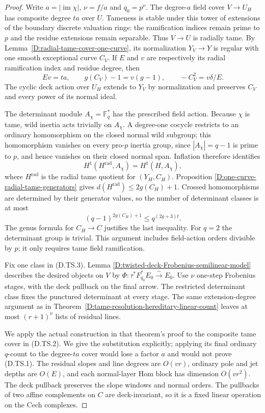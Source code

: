 \begin{proof}
Write $a=|\operatorname{im}\chi|$, $\nu=f/a$ and
$q_0=p^\nu$. The degree-$a$ field cover $V\to U_H$
has composite degree $ta$ over $U$. Tameness is stable
under this tower of extensions of the boundary discrete
valuation rings: the ramification indices remain prime
to $p$ and the residue extensions remain separable.
Thus $V\to U$ is radially tame. By
Lemma~\ref{D:radial-tame-cover-one-curve}, its normalization
$Y_V\to Y$ is regular with one smooth exceptional curve
$C_V$. If $E$ and $v$ are respectively its radial
ramification index and residue degree, then
\[
 Ev=ta,\qquad g(C_V)-1=v(g-1),\qquad
                    -C_V^2=v\delta/E.                 \tag{D.TS.2}
\]
The cyclic deck action over $U_H$ extends to $Y_V$ by
normalization and preserves $C_V$ and every power of
its normal ideal.

The determinant module $A_\chi=\mathbb F_q^*$ has
the prescribed field action. Because $\chi$ is tame,
wild inertia acts trivially on $A_\chi$. A degree-one
cocycle restricts to an ordinary homomorphism on the
closed normal wild subgroup; this homomorphism vanishes
on every pro-$p$ inertia group, since $|A_\chi|=q-1$
is prime to $p$, and hence vanishes on their closed
normal span. Inflation therefore identifies
\[
 H^1(H^{\mathrm{rad}},A_\chi)=H^1(H,A_\chi),
\]
where $H^{\mathrm{rad}}$ is the radial tame quotient for
$(Y_H,C_H)$. Proposition
\ref{D:one-curve-radial-tame-generators} gives
$d(H^{\mathrm{rad}})\leq2g(C_H)+1$. Crossed
homomorphisms are determined by their generator values,
so the number of determinant classes is at most
\[
          (q-1)^{2g(C_H)+1}\leq q^{(2g+3)t}.            \tag{D.TS.3}
\]
The genus formula for $C_H\to C$ justifies the last
inequality. For $q=2$ the determinant group is trivial.
This argument includes field-action orders divisible
by $p$; it only requires tame field ramification.

Fix one class in (D.TS.3). Lemma
\ref{D:twisted-deck-Frobenius-semilinear-model} describes
the desired objects on $V$ by
$\Phi:\tau^*F_{q_0}^*E_0\xrightarrow{\sim}E_0$.
Use $\nu$ one-step Frobenius stages, with the deck
pullback on the final arrow. The restricted determinant
class fixes the punctured determinant at every stage.
The same extension-degree argument as in
Theorem~\ref{D:tame-resolution-hereditary-linear-count}
leaves at most $(r+1)^\nu$ lists of residual lines.

We apply the actual construction in that theorem's
proof to the composite tame cover in (D.TS.2). We give
the substitution explicitly; applying its final ordinary
$q$-count to the degree-$ta$ cover would lose a factor
$a$ and would not prove (D.TS.1). The residual slopes
and line degrees are $O(vr)$, ordinary pole and jet
depths are $O(E)$, and each normal-layer Hom block has
dimension $O(vr^2)$. The deck pullback preserves the
slope windows and normal orders. The pullbacks of two
affine complements on $C$ are deck-invariant, so it is
a fixed linear operation on the Cech complexes.


\end{proof}
